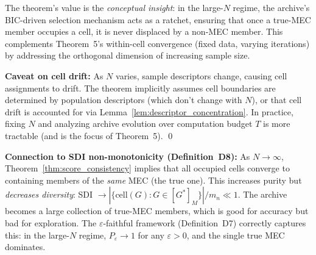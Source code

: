 \documentclass{article}
\theoremstyle{definition}
\theoremstyle{plain}
\theoremstyle{remark}
\begin{document}
The theorem's value is the \emph{conceptual insight}: in the large-$N$ regime, the
archive's BIC-driven selection mechanism acts as a ratchet, ensuring that once a
true-MEC member occupies a cell, it is never displaced by a non-MEC member. This
complements Theorem~5's within-cell convergence (fixed data, varying iterations) by
addressing the orthogonal dimension of increasing sample size.

\textbf{Caveat on cell drift:} As $N$ varies, sample descriptors change, causing
cell assignments to drift. The theorem implicitly assumes cell boundaries are
determined by population descriptors (which don't change with $N$), or that cell
drift is accounted for via Lemma~\ref{lem:descriptor_concentration}. In practice,
fixing $N$ and analyzing archive evolution over computation budget $T$ is more
tractable (and is the focus of Theorem~5). \qed

\textbf{Connection to SDI non-monotonicity (Definition~D8):} As $N \to \infty$,
Theorem~\ref{thm:score_consistency} implies that all occupied cells converge to containing members of the
\emph{same} MEC (the true one). This increases purity but \emph{decreases diversity}:
SDI $\to |\{\text{cell}(G) : G \in [G^*]_M\}| / m_n \ll 1$. The archive becomes a
large collection of true-MEC members, which is good for accuracy but bad for
exploration. The $\varepsilon$-faithful framework (Definition~D7) correctly captures
this: in the large-$N$ regime, $P_\varepsilon \to 1$ for any $\varepsilon > 0$,
and the single true MEC dominates.
\end{document}
